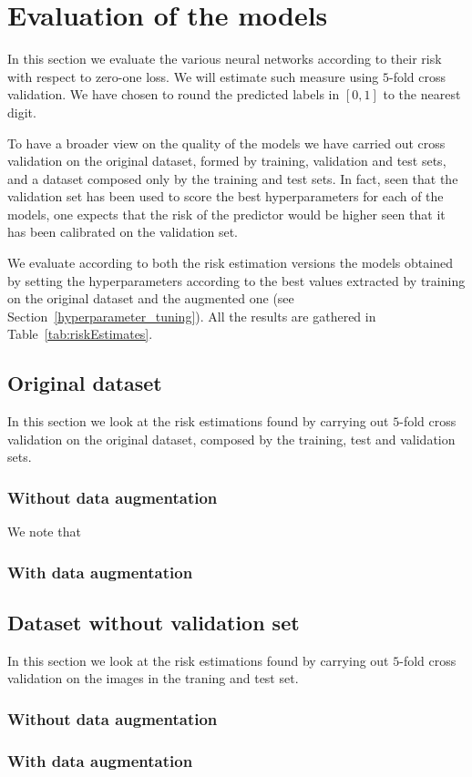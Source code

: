 \section{Evaluation of the models}\label{3_evaluation}
In this section we evaluate the various neural networks according to their risk with respect to zero-one loss. We will estimate such measure using $5$-fold cross validation. We have chosen to round the predicted labels in $\left[0,1\right]$ to the nearest digit.

To have a broader view on the quality of the models we have carried out cross validation on the original dataset, formed by training, validation and test sets, and a dataset composed only by the training and test sets. In fact, seen that the validation set has been used to score the best hyperparameters for each of the models, one expects that the risk of the predictor would be higher seen that it has been calibrated on the validation set. 

We evaluate according to both the risk estimation versions the models obtained by setting the hyperparameters according to the best values extracted by training on the original dataset and the augmented one (see Section~\ref{hyperparameter_tuning}). All the results are gathered in Table~\ref{tab:riskEstimates}.



\subsection{Original dataset}
In this section we look at the risk estimations found by carrying out $5$-fold cross validation on the original dataset, composed by the training, test and validation sets. 
\subsubsection{Without data augmentation}
We note that

\subsubsection{With data augmentation}

\subsection{Dataset without validation set}
In this section we look at the risk estimations found by carrying out $5$-fold cross validation on the images in the traning and test set. 
\subsubsection{Without data augmentation}
\subsubsection{With data augmentation}